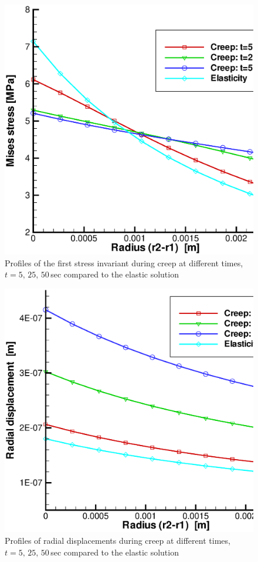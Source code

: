 \begin{figure}[H]
\centering
\includegraphics[scale=0.4]{PART_II/M/ex2_q}
\vspace{-3mm}
\caption{Profiles of the first stress invariant during creep at different times, $t=5,\,25,\,50\,$sec compared to the elastic solution}
\label{Mc_fig:ex2_q}
\end{figure}

\begin{figure}[H]
\centering
\includegraphics[scale=0.4]{PART_II/M/ex2_ur}
\vspace{-3mm}
\caption{Profiles of radial displacements during creep at different times, $t=5,\,25,\,50\,$sec compared to the elastic solution}
\label{Mc_fig:ex2_ur}
\end{figure}
